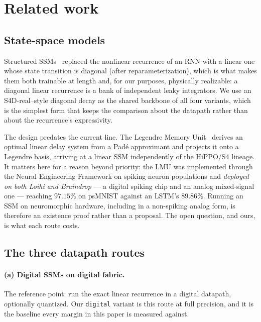 
\section{Related work}
\label{sec:related}

\subsection{State-space models}

Structured SSMs~\citep{s4,s4d} replaced the nonlinear recurrence of an RNN with a linear one
whose state transition is diagonal (after reparameterization), which is what makes them both
trainable at length and, for our purposes, physically realizable: a diagonal linear recurrence is
a bank of independent leaky integrators. We use an S4D-real--style diagonal decay as the shared
backbone of all four variants, which is the simplest form that keeps the comparison about the
datapath rather than about the recurrence's expressivity.

The design predates the current line. The Legendre Memory Unit~\citep{lmu} derives an optimal
linear delay system from a Pad\'e approximant and projects it onto a Legendre basis, arriving at
a linear SSM independently of the HiPPO/S4 lineage. It matters here for a reason beyond priority:
the LMU was implemented through the Neural Engineering Framework on spiking neuron populations
and \emph{deployed on both Loihi and Braindrop} --- a digital spiking chip and an analog
mixed-signal one --- reaching $97.15\%$ on psMNIST against an LSTM's $89.86\%$. Running an SSM on
neuromorphic hardware, including in a non-spiking analog form, is therefore an existence proof
rather than a proposal. The open question, and ours, is what each route costs.

\subsection{The three datapath routes}

\paragraph{(a) Digital SSMs on digital fabric.} The reference point: run the exact linear
recurrence in a digital datapath, optionally quantized. Our \texttt{digital} variant is this
route at full precision, and it is the baseline every margin in this paper is measured against.

